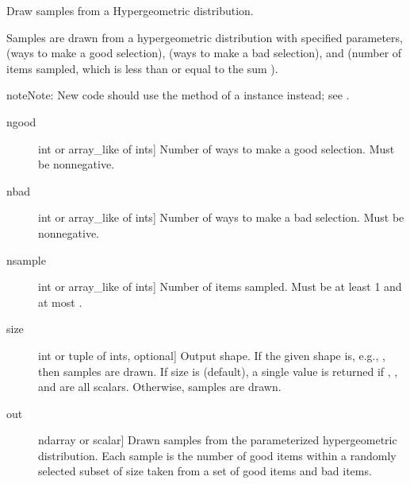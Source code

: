 \documentclass[letterpaper,10pt,english]{sphinxmanual}
\begin{document}
\begin{fulllineitems}
\label{\detokenize{infrapy.utils:infrapy.utils.ref2sac.hypergeometric}}
Draw samples from a Hypergeometric distribution.

Samples are drawn from a hypergeometric distribution with specified
parameters,  (ways to make a good selection),  (ways to make
a bad selection), and  (number of items sampled, which is less
than or equal to the sum ).

\begin{sphinxadmonition}{note}{Note:}
New code should use the  method of a 
instance instead; see .
\end{sphinxadmonition}
\begin{description}
\item[{ngood}] \leavevmode{[}int or array\_like of ints{]}
Number of ways to make a good selection.  Must be nonnegative.

\item[{nbad}] \leavevmode{[}int or array\_like of ints{]}
Number of ways to make a bad selection.  Must be nonnegative.

\item[{nsample}] \leavevmode{[}int or array\_like of ints{]}
Number of items sampled.  Must be at least 1 and at most
.

\item[{size}] \leavevmode{[}int or tuple of ints, optional{]}
Output shape.  If the given shape is, e.g., , then
 samples are drawn.  If size is  (default),
a single value is returned if , , and 
are all scalars.  Otherwise, 
samples are drawn.

\end{description}
\begin{description}
\item[{out}] \leavevmode{[}ndarray or scalar{]}
Drawn samples from the parameterized hypergeometric distribution. Each
sample is the number of good items within a randomly selected subset of
size  taken from a set of  good items and  bad items.


\end{description}
\end{fulllineitems}
\end{document}
